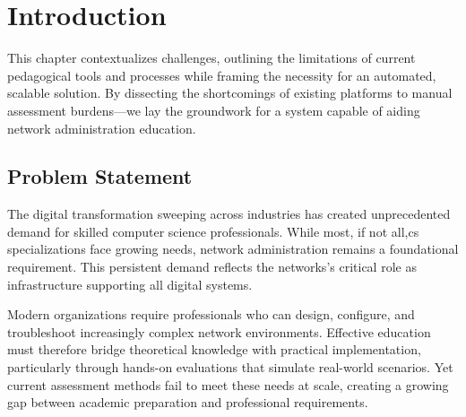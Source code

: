
\chapter{Introduction}


\label{Chapter1Introduction}


This chapter contextualizes challenges, outlining the limitations of current pedagogical tools and processes while framing the necessity 
for an automated, scalable solution. By dissecting the shortcomings of existing platforms to manual assessment burdens—we lay the groundwork 
for a system capable of aiding network administration education.


\section{Problem Statement}

The digital transformation sweeping across industries has created unprecedented demand for skilled computer science professionals.
While most, if not all,\ac{cs} specializations face growing needs, network administration remains a foundational requirement. This persistent demand 
reflects the networks's critical role as infrastructure supporting all digital systems.

Modern organizations require professionals who can design, configure, and troubleshoot increasingly complex network environments. 
Effective education must therefore bridge theoretical knowledge with practical implementation, particularly through hands-on evaluations 
that simulate real-world scenarios. Yet current assessment methods fail to meet these needs at scale, creating a growing gap between academic 
preparation and professional requirements.

